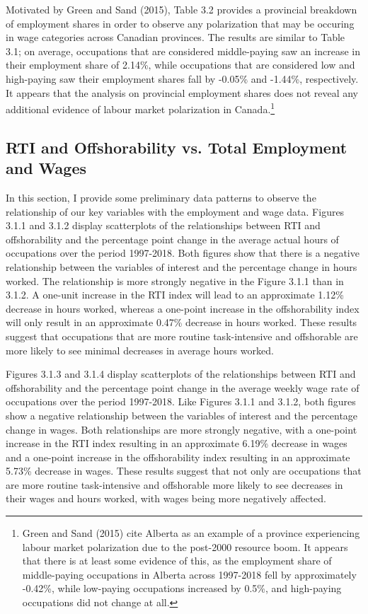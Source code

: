 \documentclass[undefended]{bumrp}
\begin{document}
Motivated by Green and Sand (2015), Table 3.2 provides a provincial breakdown of employment shares in order to observe any polarization that may be occuring in wage categories across Canadian provinces. The results are similar to Table 3.1; on average, occupations that are considered middle-paying saw an increase in their employment share of 2.14\%, while occupations that are considered low and high-paying saw their employment shares fall by -0.05\% and -1.44\%, respectively.  It appears that the analysis on provincial employment shares does not reveal any additional evidence of labour market polarization in Canada.\footnote{Green and Sand (2015) cite Alberta as an example of a province experiencing labour market polarization due to the post-2000 resource boom. It appears that there is at least some evidence of this, as the employment share of middle-paying occupations in Alberta across 1997-2018 fell by approximately -0.42\%, while low-paying occupations increased by 0.5\%, and high-paying occupations did not change at all.}

\subsection{RTI and Offshorability vs. Total Employment and Wages}

In this section, I provide some preliminary data patterns to observe the relationship of our key variables with the employment and wage data. Figures 3.1.1 and 3.1.2 display scatterplots of the relationships between RTI and offshorability and the percentage point change in the average actual hours of occupations over the period 1997-2018. Both figures show that there is a negative relationship between the variables of interest and the percentage change in hours worked. The relationship is more strongly negative in the Figure 3.1.1 than in 3.1.2. A one-unit increase in the RTI index will lead to an approximate 1.12\% decrease in hours worked, whereas a one-point increase in the offshorability index will only result in an approximate 0.47\% decrease in hours worked. These results suggest that occupations that are more routine task-intensive and offshorable are more likely to see minimal decreases in average hours worked. 

Figures 3.1.3 and 3.1.4 display scatterplots of the relationships between RTI and offshorability and the percentage point change in the average weekly wage rate of occupations over the period 1997-2018. Like Figures 3.1.1 and 3.1.2, both figures show a negative relationship between the variables of interest and the percentage change in wages. Both relationships are more strongly negative, with a one-point increase in the RTI index resulting in an approximate 6.19\% decrease in wages and a one-point increase in the offshorability index resulting in an approximate 5.73\% decrease in wages. These results suggest that not only are occupations that are more routine task-intensive and offshorable more likely to see decreases in their wages and hours worked, with wages being more negatively affected.
\end{document}
